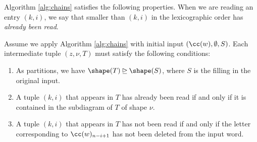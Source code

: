 Algorithm \ref{alg:chains} satisfies the following properties.  When we are reading an entry $(k,i)$, we say that smaller than $(k,i)$ in the lexicographic order has \textit{already been read}. 
    \begin{lemma}\label{lemma: props of the alg}
    Assume we apply Algorithm \ref{alg:chains} with initial input $(\cc(w), \emptyset, S)$.
        Each intermediate tuple $(z, \nu, T)$ must  satisfy the following conditions:
    \begin{enumerate}[label=(\alph*)]
        \item As partitions, we have $\shape(T)\unrhd \shape(S)$, where $S$ is the filling in the original input.
        \item A tuple $(k,i)$ that appears in $T$ has already been read if and only if it is contained in the subdiagram of $T$ of shape $\nu$.
        \item A tuple $(k,i)$ that appears in $T$ has not been read if and only if the letter corresponding to $\cc(w)_{n-i+1}$ has not been deleted from the input word. 
    \end{enumerate}
    \end{lemma}
